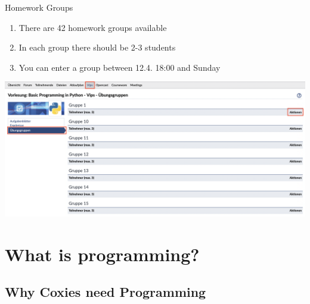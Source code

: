 \begin{frame}{Homework Groups}

    \begin{enumerate}
        \item There are 42 homework groups available
        \item In each group there should be 2-3 students
        \item You can enter a group between 12.4. 18:00 and Sunday
    \end{enumerate}

    \vspace{1em}

    \includegraphics[width=\textwidth]{vipsgroups.png}

\end{frame}







\section{What is programming?}

\subsection{Why Coxies need Programming}

